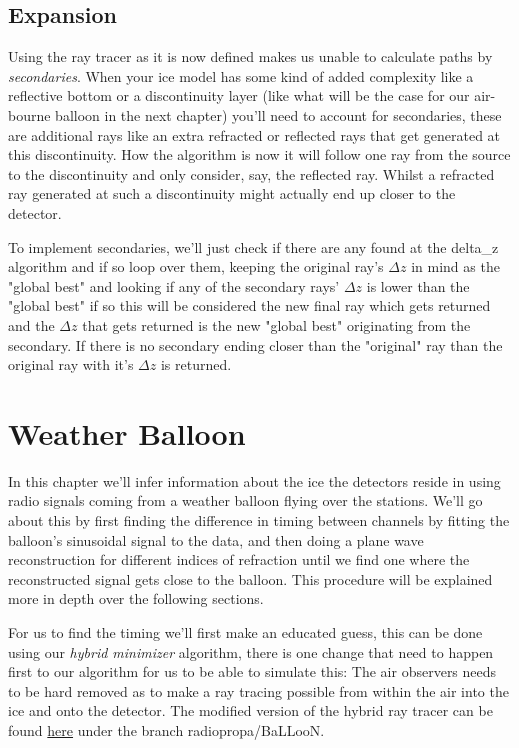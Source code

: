 \documentclass[11pt,a4paper,faculty=we,language=en,doctype=report]{cls/ugent-doc}
\begin{document}
\section{Expansion}
Using the ray tracer as it is now defined makes us unable to calculate paths by
\textit{secondaries}.  When your ice model has some kind of added complexity
like a reflective bottom or a discontinuity layer (like what will be the case
for our air-bourne balloon in the next chapter) you'll need to account for
secondaries, these are additional rays like an extra refracted or reflected
rays that get generated at this discontinuity. How the algorithm is now it will
follow one ray from the source to the discontinuity and only consider, say, the
reflected ray. Whilst a refracted ray generated at such a discontinuity might
actually end up closer to the detector.

To implement secondaries, we'll just check if there are any found at the
delta\_z algorithm and if so loop over them, keeping the original ray's $\Delta
z$ in mind as the "global best" and looking if any of the secondary rays'
$\Delta z$ is lower than the "global best" if so this will be considered the
new final ray which gets returned and the $\Delta z$ that gets returned is the
new "global best" originating from the secondary. If there is no secondary
ending closer than the "original" ray than the original ray with it's $\Delta
z$ is returned.

\chapter{Weather Balloon}
\label{chap:WB}
In this chapter we'll infer information about the ice the detectors reside in
using radio signals coming from a weather balloon flying over the stations. 
We'll go about this by first finding the difference in timing between  
channels by fitting the balloon's sinusoidal signal to the data, and
then doing a plane wave reconstruction for different indices of refraction
until we find one where the reconstructed signal gets close to the balloon.
This procedure will be explained more in depth over the following sections.

For us to find the timing we'll first make an educated guess, this can be done
using our \textit{hybrid minimizer} algorithm, there is one change that need to
happen first to our algorithm for us to be able to simulate this: The air
observers needs to be hard removed as to make a ray tracing possible from
within the air into the ice and onto the detector. The modified
version of the hybrid ray tracer can be found \href{https://github.com/arthuradriaens-code/NuRadioMC.git}{here} under the branch radiopropa/BaLLooN.
\end{document}
